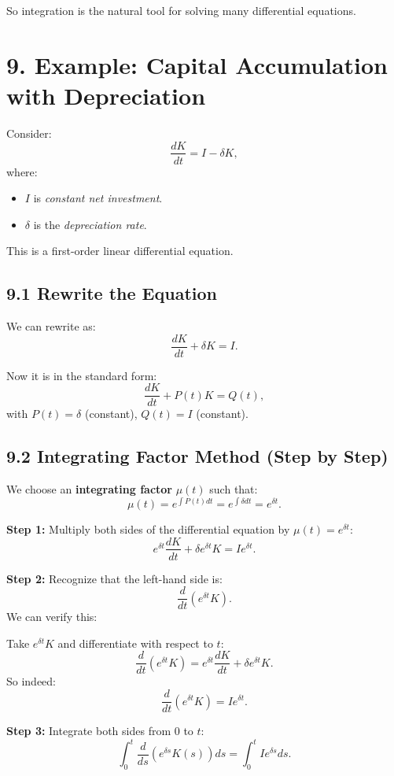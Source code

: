 \documentclass[12pt]{article}
\begin{document}
So integration is the natural tool for solving many differential equations.

\section*{9. Example: Capital Accumulation with Depreciation}

Consider:
\[
\frac{dK}{dt} = I - \delta K,
\]
where:
\begin{itemize}
\item $I$ is \emph{constant net investment}.
\item $\delta$ is the \emph{depreciation rate}.
\end{itemize}

This is a first-order linear differential equation.

\subsection*{9.1 Rewrite the Equation}

We can rewrite as:
\[
\frac{dK}{dt} + \delta K = I.
\]

Now it is in the standard form:
\[
\frac{dK}{dt} + P(t)K = Q(t),
\]
with $P(t)=\delta$ (constant), $Q(t)=I$ (constant).

\subsection*{9.2 Integrating Factor Method (Step by Step)}

We choose an \textbf{integrating factor} $\mu(t)$ such that:
\[
\mu(t) = e^{\int P(t)dt} = e^{\int \delta dt} = e^{\delta t}.
\]

\textbf{Step 1:} Multiply both sides of the differential equation by $\mu(t) = e^{\delta t}$:
\[
e^{\delta t}\frac{dK}{dt} + \delta e^{\delta t}K = I e^{\delta t}.
\]

\textbf{Step 2:} Recognize that the left-hand side is:
\[
\frac{d}{dt}(e^{\delta t}K).
\]
We can verify this:

Take $e^{\delta t}K$ and differentiate with respect to $t$:
\[
\frac{d}{dt}(e^{\delta t}K) = e^{\delta t}\frac{dK}{dt} + \delta e^{\delta t}K.
\]
So indeed:
\[
\frac{d}{dt}(e^{\delta t}K) = I e^{\delta t}.
\]

\textbf{Step 3:} Integrate both sides from $0$ to $t$:
\[
\int_0^t \frac{d}{ds}(e^{\delta s}K(s)) ds = \int_0^t I e^{\delta s} ds.
\]
\end{document}
